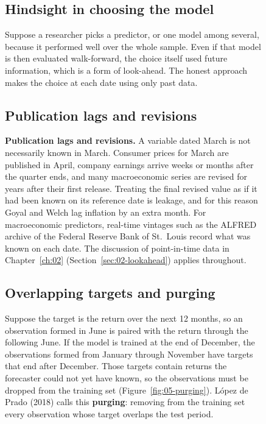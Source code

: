 \begin{figure}[htbp]
\subsection{Hindsight in choosing the model} 

Suppose a researcher picks a predictor, or one model among several, because it performed well over the whole sample. Even if that model is then evaluated walk-forward, the choice itself used future information, which is a form of look-ahead. The honest approach makes the choice at each date using only past data.


\subsection{Publication lags and revisions}

\textbf{Publication lags and revisions.} A variable dated March is not necessarily known in March. Consumer prices for March are published in April, company earnings arrive weeks or months after the quarter ends, and many macroeconomic series are revised for years after their first release. Treating the final revised value as if it had been known on its reference date is leakage, and for this reason Goyal and Welch lag inflation by an extra month. For macroeconomic predictors, real-time vintages such as the ALFRED archive of the Federal Reserve Bank of St.\ Louis record what was known on each date. The discussion of point-in-time data in Chapter~\ref{ch:02} (Section~\ref{sec:02-lookahead}) applies throughout.


\subsection{Overlapping targets and purging} 

Suppose the target is the return over the next 12 months, so an observation formed in June is paired with the return through the following June. If the model is trained at the end of December, the observations formed from January through November have targets that end after December. Those targets contain returns the forecaster could not yet have known, so the observations must be dropped from the training set (Figure~\ref{fig:05-purging}). L\'opez de Prado (2018) calls this \textbf{purging}: removing from the training set every observation whose target overlaps the test period.


\end{figure}
